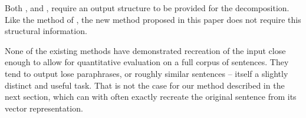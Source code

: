 \documentclass[11pt]{article}
\theoremstyle{plain}
\theoremstyle{definition}
\begin{document}
Both \textcite{Dinu2014CompositionalGeneration}, and  \textcite{iyyer2014generating}, require an output structure to be provided for the decomposition. Like the method of  \textcite{Bowman2015SmoothGeneration}, the new method proposed in this paper does not require this structural information.

None of the existing methods have demonstrated recreation of the input close enough to allow for quantitative evaluation on a full corpus of sentences. They tend to output lose paraphrases, or roughly similar sentences -- itself a slightly distinct and useful task.  That is not the case for our method described in the next section, which can with often exactly recreate the original sentence from its vector representation.





\printbibliography
	
\end{document}
